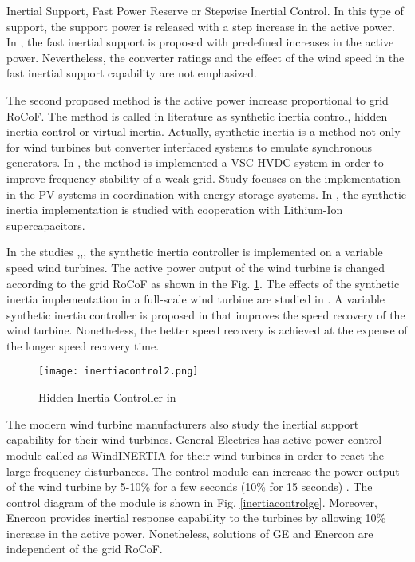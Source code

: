 Inertial Support, Fast Power Reserve or Stepwise Inertial Control. In this type of support, the support power is released with a step increase in the active power. In \cite{Hansen2014}, the fast inertial support is proposed with predefined increases in the active power. Nevertheless, the converter ratings and the effect of the wind speed in the fast inertial support capability are not emphasized. \par
The second proposed method is the active power increase proportional to grid RoCoF. The method is called in literature as synthetic inertia control, hidden inertia control or
virtual inertia. Actually, synthetic inertia is a method not only for wind turbines but converter interfaced systems to emulate synchronous generators. In \cite{Zhu2013a}, the method is implemented a VSC-HVDC system in order to improve frequency stability of a weak grid. Study \cite{Hernandez2017} focuses on the implementation in the PV systems in coordination with energy storage systems. In \cite{Zhu2018a}, the synthetic inertia implementation is studied with cooperation with Lithium-Ion supercapacitors. \par
In the studies \cite{VanDeVyver2016},\cite{Conroy2008},\cite{Gonzalez-Longatt2013}, the synthetic inertia controller is implemented on a variable speed wind turbines. The active power output of the wind turbine is changed according to the grid RoCoF as shown in the Fig. \ref{inertiacontrol2}. The effects of the synthetic inertia implementation in a full-scale wind turbine are studied in \cite{Gonzalez-Longatt2013}. A variable synthetic inertia controller is proposed in \cite{Bonfiglio2019} that improves the speed recovery of the wind turbine. Nonetheless, the better speed recovery is achieved at the expense of the longer speed recovery time. \par
\begin{figure}[h!]
	\centering
	\texttt{[image: inertiacontrol2.png]}
	\caption[Installed Renewable Energy Capacity of Leading Countries]{Hidden Inertia Controller in\cite{Gonzalez-Longatt2013}}
	\label{inertiacontrol2}
\end{figure}
The modern wind turbine manufacturers also study the inertial support capability for their wind turbines. General Electrics has active power control module called as WindINERTIA for their wind turbines in order to react the large frequency disturbances. The control module can increase the power output of the wind turbine by 5-10\% for a few seconds (10\% for 15 seconds) \cite{Clark2009}. The control diagram of the module is shown in Fig. \ref{inertiacontrolge}. Moreover, Enercon provides inertial response capability to the turbines by allowing 10\% increase in the active power\cite{Enercon2018}. Nonetheless, solutions of GE and Enercon are independent of the grid RoCoF.\par
